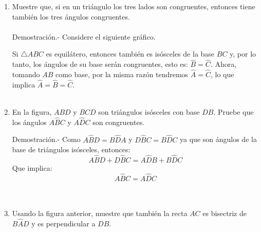 \begin{enumerate}
	\item Muestre que, si en un triángulo los tres lados son congruentes, entonces tiene también los tres ángulos congruentes.\\\\
	Demostración.-\; Considere el siguiente gráfico.

	\begin{center}
	\end{center}

	Si $\triangle ABC$ es equilátero, entonces también es isósceles de la base $BC$ y, por lo tanto, los ángulos de su base serán congruentes, esto es: $\widehat{B} = \widehat{C}$. Ahora, tomando $AB$ como base, por la misma razón tendremos $\widehat{A} = \widehat{C}$, lo que implica $\widehat{A} = \widehat{B} = \widehat{C}$.\\\\

	\item En la figura, $ABD$ y $BCD$ son triángulos isósceles con base $DB$. Pruebe que los ángulos $A\widehat{B}C$ y $A\widehat{D}C$ son congruentes.

	\begin{center}
	\end{center}

	Demostración.-\; Como $A\widehat{B}D = B\widehat{D}A$ y $D\widehat{B}C = B\widehat{D}C$ ya que son ángulos de la base de triángulos isósceles, entonces: $$A\widehat{B}D + D\widehat{B}C=A\widehat{D}B + B\widehat{D}C$$ Que implica:
	$$A\widehat{B}C=A\widehat{D}C$$\\\\

	\item Usando la figura anterior, muestre que también la recta $AC$ es bisectriz de $B\widehat{A}D$ y es perpendicular a $DB$. \\\\


\end{enumerate}
